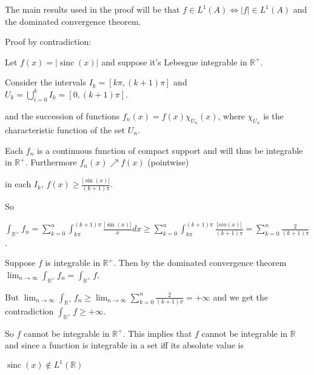 \documentclass[12pt]{article}
\begin{document}
The main results used in the proof will be that $f \in L^1(A) \iff |f|\in L^1(A)$ and the dominated convergence theorem.

Proof by contradiction:

Let $f(x) = |\operatorname{sinc}(x)|$ and suppose it's Lebesgue integrable in $\mathbb{R}^+$.


Consider the intervals $I_k = [k\pi, (k+1)\pi]$ and $U_k = \bigcup_{i=0}^k I_k = [0, (k+1)\pi]$.

and the succession of functions $f_n(x) = f(x)\chi_{U_n}(x)$, where $\chi_{U_n}$ is the characteristic function of the set $U_n$.

Each $f_n$ is a continuous function of compact support and will thus be integrable in $\mathbb{R}^+$. Furthermore $f_n(x) \nearrow f(x)$ (pointwise)

in each $I_k$, $f(x)\ge \frac{|\sin(x)|}{(k+1)\pi}$.

So

$ \displaystyle \int_{\mathbb{R}^+} f_n = \sum_{k=0}^{n} \int_{k\pi}^{(k+1)\pi} \frac{|\sin(x)|}{x} dx \ge \sum_{k=0}^{n} \int_{k\pi}^{(k+1)\pi} \frac{|sin(x)|}{(k+1)\pi} = \sum_{k=0}^{n} \frac{2}{(k+1)\pi}$.

Suppose $f$ is integrable in $\mathbb{R}^+$. Then by the dominated convergence theorem $\lim_{n \to \infty} \int_{\mathbb{R}^+} f_n = \int_{\mathbb{R}^+} f$.

But $\lim_{n \to \infty} \int_{\mathbb{R}^+} f_n \ge \lim_{n \to \infty}  \sum_{k=0}^{n} \frac{2}{(k+1)\pi} = +\infty$ and we get the contradiction $\int_{\mathbb{R}^+} f \ge +\infty$.

So $f$ cannot be integrable in $\mathbb{R}^+$.
This implies that $f$ cannot be integrable in $\mathbb{R}$ and since a function is integrable in a set iff its absolute value is

$\operatorname{sinc}(x) \notin L^1(\mathbb{R})$
\end{document}
